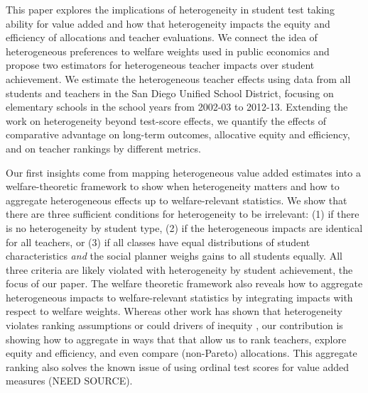 \documentclass{article}
\theoremstyle{definition}
\theoremstyle{definition}
\theoremstyle{definition}
\theoremstyle{definition}
\begin{document}
    
    This paper explores the implications of heterogeneity in student test taking ability for value added and how that heterogeneity impacts the equity and efficiency of allocations and teacher evaluations. We connect the idea of heterogeneous preferences to welfare weights used in public economics and propose two estimators for heterogeneous teacher impacts over student achievement. We estimate the heterogeneous teacher effects using data from all students and teachers in the San Diego Unified School District, focusing on elementary schools in the school years from 2002-03 to 2012-13. Extending the work on heterogeneity beyond test-score effects, we quantify the effects of comparative advantage on long-term outcomes, allocative equity and efficiency, and on teacher rankings by different metrics.
    
    Our first insights come from mapping heterogeneous value added estimates into a welfare-theoretic framework to show when heterogeneity matters and how to aggregate heterogeneous effects up to welfare-relevant statistics. We show that there are three sufficient conditions for heterogeneity to be irrelevant: (1) if there is no heterogeneity by student type, (2) if the heterogeneous impacts are identical for all teachers, or (3) if all classes have equal distributions of student characteristics \textit{and} the social planner weighs gains to all students equally. All three criteria are likely violated with heterogeneity by student achievement, the focus of our paper. The welfare theoretic framework also reveals how to aggregate heterogeneous impacts to welfare-relevant statistics by integrating impacts with respect to welfare weights. Whereas other work has shown that heterogeneity violates ranking assumptions \citep{condie2014teacher} or could drivers of inequity \citep{Delgado2020,bates2022teacher}, our contribution is showing how to aggregate in ways that that allow us to rank teachers, explore equity and efficiency, and even compare (non-Pareto) allocations. This aggregate ranking also solves the known issue of using ordinal test scores for value added measures (NEED SOURCE). 
    
\end{document}
